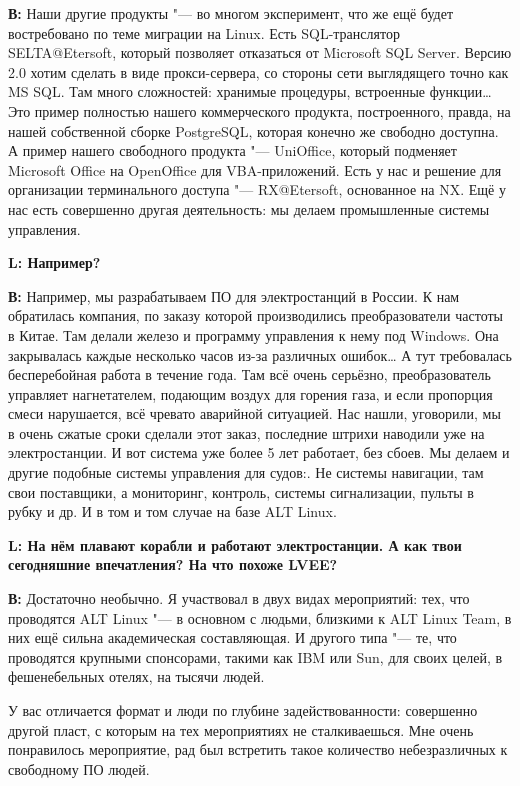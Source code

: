 \documentclass[10pt, a5paper]{article}
\begin{document}
{\noindent \bf В:} Наши другие продукты "--- во многом эксперимент, что же ещё будет востребовано по теме миграции на Linux. Есть SQL-транслятор SELTA@Etersoft, который позволяет отказаться от Microsoft SQL Server. Версию 2.0 хотим сделать в виде прокси-сервера, со стороны сети выглядящего точно как MS SQL. Там много сложностей: хранимые процедуры, встроенные функции\ldots Это пример полностью нашего коммерческого продукта, построенного, правда, на нашей собственной сборке PostgreSQL, которая конечно же свободно доступна. А пример нашего свободного продукта "--- UniOffice, который  подменяет Microsoft Office на OpenOffice для VBA-приложений. Есть у нас и решение для организации терминального доступа "--- RX@Etersoft, основанное на NX. Ещё у нас есть совершенно другая деятельность: мы делаем промышленные системы управления. 

{\noindent \bf L: Например?}

{\noindent \bf В:} Например, мы разрабатываем ПО для электростанций в России. К нам обратилась компания, по заказу которой производились преобразователи частоты в Китае. Там делали железо и программу управления к нему под Windows. Она закрывалась каждые несколько часов из-за различных ошибок… А тут требовалась бесперебойная работа в течение года. Там всё очень серьёзно, преобразователь управляет нагнетателем, подающим воздух для горения газа, и если пропорция смеси нарушается, всё чревато аварийной ситуацией. Нас нашли, уговорили, мы в очень сжатые сроки сделали этот заказ, последние штрихи наводили уже на электростанции. И вот система уже более 5 лет работает, без сбоев. Мы делаем и другие подобные системы управления для судов:. Не системы навигации, там свои поставщики, а мониторинг, контроль, системы сигнализации, пульты в рубку и др. И в том и том случае на базе ALT Linux. 

{\noindent \bf L: На нём плавают корабли и работают электростанции. А как твои сегодняшние впечатления? На что похоже LVEE?}

{\noindent \bf В:} Достаточно необычно. Я участвовал в двух видах мероприятий: тех, что проводятся ALT Linux "--- в основном с людьми, близкими к ALT Linux Team, в них ещё сильна академическая составляющая. И другого типа "--- те, что проводятся крупными спонсорами, такими как IBM или Sun, для своих целей, в фешенебельных отелях,  на тысячи людей.

У вас отличается формат и люди по глубине задействованности: совершенно другой пласт, с которым на тех мероприятиях не сталкиваешься. Мне очень понравилось мероприятие, рад был встретить такое количество небезразличных к свободному ПО людей.
\end{document}
